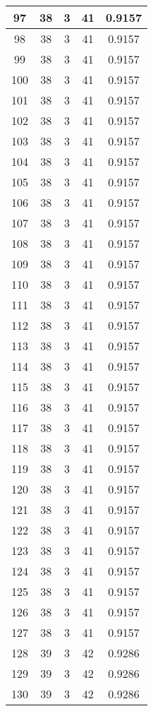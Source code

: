 \documentclass[letterpaper, 12pt]{article}
\begin{document}
\begin{longtable}{|c|c|c|c|c|}
\hline
97 & 38 & 3 & 41 & 0.9157 \\
\hline
98 & 38 & 3 & 41 & 0.9157 \\
\hline
99 & 38 & 3 & 41 & 0.9157 \\
\hline
100 & 38 & 3 & 41 & 0.9157 \\
\hline
101 & 38 & 3 & 41 & 0.9157 \\
\hline
102 & 38 & 3 & 41 & 0.9157 \\
\hline
103 & 38 & 3 & 41 & 0.9157 \\
\hline
104 & 38 & 3 & 41 & 0.9157 \\
\hline
105 & 38 & 3 & 41 & 0.9157 \\
\hline
106 & 38 & 3 & 41 & 0.9157 \\
\hline
107 & 38 & 3 & 41 & 0.9157 \\
\hline
108 & 38 & 3 & 41 & 0.9157 \\
\hline
109 & 38 & 3 & 41 & 0.9157 \\
\hline
110 & 38 & 3 & 41 & 0.9157 \\
\hline
111 & 38 & 3 & 41 & 0.9157 \\
\hline
112 & 38 & 3 & 41 & 0.9157 \\
\hline
113 & 38 & 3 & 41 & 0.9157 \\
\hline
114 & 38 & 3 & 41 & 0.9157 \\
\hline
115 & 38 & 3 & 41 & 0.9157 \\
\hline
116 & 38 & 3 & 41 & 0.9157 \\
\hline
117 & 38 & 3 & 41 & 0.9157 \\
\hline
118 & 38 & 3 & 41 & 0.9157 \\
\hline
119 & 38 & 3 & 41 & 0.9157 \\
\hline
120 & 38 & 3 & 41 & 0.9157 \\
\hline
121 & 38 & 3 & 41 & 0.9157 \\
\hline
122 & 38 & 3 & 41 & 0.9157 \\
\hline
123 & 38 & 3 & 41 & 0.9157 \\
\hline
124 & 38 & 3 & 41 & 0.9157 \\
\hline
125 & 38 & 3 & 41 & 0.9157 \\
\hline
126 & 38 & 3 & 41 & 0.9157 \\
\hline
127 & 38 & 3 & 41 & 0.9157 \\
\hline
128 & 39 & 3 & 42 & 0.9286 \\
\hline
129 & 39 & 3 & 42 & 0.9286 \\
\hline
130 & 39 & 3 & 42 & 0.9286 \\

\end{longtable}
\end{document}

